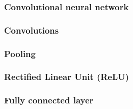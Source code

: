 
\subsubsection{Convolutional neural network}


\subsubsection{Convolutions}


\newpage

\subsubsection{Pooling}


\subsubsection{Rectified Linear Unit (ReLU)}


\subsubsection{Fully connected layer}

